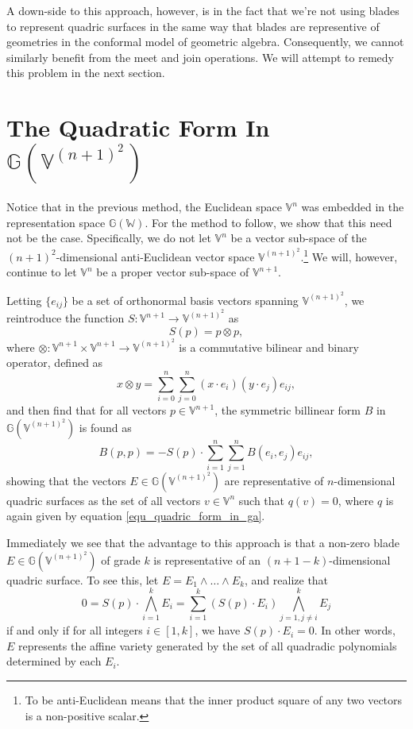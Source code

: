 \documentclass{birkjour}
\theoremstyle{definition}
\theoremstyle{remark}
\numberwithin{equation}{section}
\newcommand{\G}{\mathbb{G}}
\newcommand{\V}{\mathbb{V}}
\newcommand{\W}{\mathbb{W}}
\begin{document}
A down-side to this approach, however, is in the fact that we're not using blades
to represent quadric surfaces in the same way that blades are representive of geometries
in the conformal model of geometric algebra.  Consequently, we cannot similarly benefit
from the meet and join operations.
We will attempt to remedy this problem in the next section.

\section{The Quadratic Form In $\G(\V^{(n+1)^2})$}

Notice that in the previous method, the Euclidean space $\V^n$ was
embedded in the representation space $\G(\W)$.  For the method to
follow, we show that this need not be the case.  Specifically, we
do not let $\V^n$ be a vector sub-space of the $(n+1)^2$-dimensional
anti-Euclidean vector space $\V^{(n+1)^2}$.\footnote{To be anti-Euclidean means
that the inner product square of any two vectors is a non-positive scalar.}
We will, however, continue to let $\V^n$ be a proper vector sub-space of $\V^{n+1}$.

Letting $\{e_{ij}\}$ be a set
of orthonormal basis vectors spanning $\V^{(n+1)^2}$, we reintroduce the
function $S:\V^{n+1}\to\V^{(n+1)^2}$ as
\begin{equation}
S(p) = p\otimes p,
\end{equation}
where $\otimes:\V^{n+1}\times\V^{n+1}\to\V^{(n+1)^2}$ is a commutative
bilinear and binary operator, defined as
\begin{equation}
x\otimes y = \sum_{i=0}^n\sum_{j=0}^n(x\cdot e_i)(y\cdot e_j)e_{ij},
\end{equation}
and then find that for all vectors $p\in\V^{n+1}$, the symmetric billinear form
$B$ in $\G(\V^{(n+1)^2})$ is found as
\begin{equation}\label{equ_quadric_intersectable}
B(p,p) = -S(p)\cdot\sum_{i=1}^n\sum_{j=1}^n B(e_i,e_j)e_{ij},
\end{equation}
showing that the vectors $E\in\G(\V^{(n+1)^2})$ are representative
of $n$-dimensional quadric surfaces as the set of all vectors $v\in\V^n$
such that $q(v)=0$, where $q$ is again given by equation \eqref{equ_quadric_form_in_ga}.

Immediately we see that the advantage to this approach is that a
non-zero blade $E\in\G(\V^{(n+1)^2})$ of grade $k$ is representative
of an $(n+1-k)$-dimensional quadric surface.  To see this,
let $E=E_1\wedge\dots\wedge E_k$, and realize that
\begin{equation}
0 = S(p)\cdot\bigwedge_{i=1}^k E_i = \sum_{i=1}^k (S(p)\cdot E_i)\bigwedge_{j=1,j\neq i}^k E_j
\end{equation}
if and only if for all integers $i\in[1,k]$, we have $S(p)\cdot E_i=0$.  In other words,
$E$ represents the affine variety generated by the set of all quadradic polynomials
determined by each $E_i$.
\end{document}
